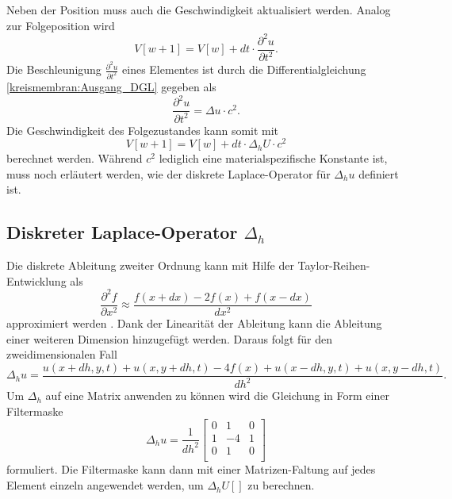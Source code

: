 Neben der Position muss auch die Geschwindigkeit aktualisiert werden.
Analog zur Folgeposition wird
\begin{equation*}
	V[w+1] = V[w] + dt \cdot \frac{\partial^2u}{\partial t^2}.
\end{equation*}    
Die Beschleunigung $ \frac{\partial^2u}{\partial t^2} $  eines Elementes ist durch die Differentialgleichung \ref{kreismembran:Ausgang_DGL} gegeben als
\begin{equation*}
	\frac{\partial^2u}{\partial t^2} = \Delta u \cdot c^2.
\end{equation*}
Die Geschwindigkeit des Folgezustandes kann somit mit
\begin{equation}
	V[w+1] = V[w] + dt \cdot \Delta_h U \cdot c^2
\end{equation}
berechnet werden.
Während $ c^2 $ lediglich eine materialspezifische Konstante ist,
muss noch erläutert werden, wie der diskrete Laplace-Operator für
$ \Delta_h u $ definiert ist.

\subsection{Diskreter Laplace-Operator $\Delta_h$}
%
Die diskrete Ableitung zweiter Ordnung kann mit Hilfe der Taylor-Reihen-Entwicklung als
\begin{equation*}
	\frac{\partial^2f}{\partial x^2} \approx \frac{f(x+dx)-2f(x)+f(x-dx)}{dx^2}
\end{equation*}
approximiert werden \cite{kreismembran:Digital_Image_processing}.
Dank der Linearität der Ableitung kann die Ableitung einer weiteren
Dimension hinzugefügt werden.
Daraus folgt für den zweidimensionalen Fall 
\begin{equation*}
	\Delta_h u= \frac{u(x+dh,y,t)+u(x,y+dh,t)-4f(x)+u(x-dh,y,t)+u(x,y-dh,t)}{dh^2}.
\end{equation*}
Um $ \Delta_h $ auf eine Matrix anwenden zu können wird die Gleichung
in Form einer Filtermaske 
%
\begin{equation}
 	\Delta_h u= \frac{1}{dh^2}
 	\left[ {\begin{array}{ccc}
 			0 & 1  & 0\\
 			1 & -4 & 1\\
 			0 & 1  & 0\\
 	\end{array} } \right]
\end{equation}
formuliert.
Die Filtermaske kann dann mit einer Matrizen-Faltung
auf jedes Element einzeln angewendet werden,
um $ \Delta_h U[] $ zu berechnen.

